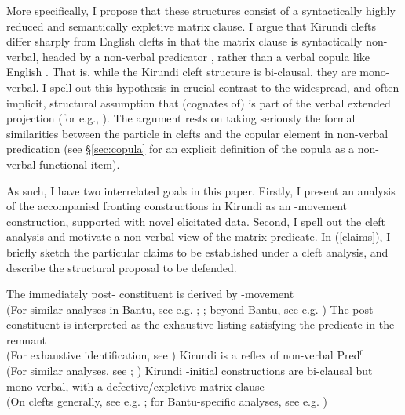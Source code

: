 \documentclass[12pt]{article}
\begin{document}
More specifically, I propose that these structures consist of a syntactically highly reduced and semantically expletive matrix clause. I argue that Kirundi clefts differ sharply from English clefts in that the matrix clause is syntactically non-verbal, headed by a non-verbal predicator , rather than a verbal copula like English . That is, while the Kirundi cleft structure is bi-clausal, they are mono-verbal. I spell out this hypothesis in crucial contrast to the widespread, and often implicit, structural assumption that (cognates of)  is part of the verbal extended projection (for e.g., \citealt{zentz-2016}). The argument rests on taking seriously the formal similarities between the particle in clefts and the copular element in non-verbal predication (see \S\ref{sec:copula} for an explicit definition of the copula as a non-verbal functional item).

As such, I have two interrelated goals in this paper. Firstly, I present an analysis of the  accompanied fronting constructions in Kirundi as an \abar{}-movement construction, supported with novel elicitated data. Second, I spell out the cleft analysis and motivate a non-verbal view of the matrix predicate. In (\ref{claims}), I briefly sketch the particular claims to be established under a cleft analysis, and describe the structural proposal to be defended. 

\bex
\ex\label{claims} 
\bxl
	\ex\label{claims-abar} The immediately post- constituent is derived by \abar{}-movement\\
		{\footnotesize (For similar analyses in Bantu, see e.g. \citealt{schneider-zioga-2007,abels-muriungi-2008}; \citealt[p. 182ff]{zentz-2016}; beyond Bantu, see e.g. \citealt{torrence-2013vol,torrence-2013,klecha-martinovic-2015,martinovic-2021} ) }
	\ex\label{claims-exh} The post- constituent is interpreted as the exhaustive listing satisfying the predicate in the remnant\\
		{\footnotesize (For exhaustive identification, see \citealt{horvath-2005,horvath-2007,horvath-2013,green-2007,hartmann-zimmermann-2012,klecha-martinovic-2015,fominyam-simik-2017})} %
	\ex\label{claims-pred} Kirundi  is a reflex of non-verbal Pred$^{0}$\\
		{\footnotesize (For similar analyses, see \citealt{wasike-2007}; \citealt[193ff]{diercks-2010})}
	\ex\label{claims-nonverb} Kirundi -initial constructions are bi-clausal but mono-verbal, with a defective/expletive  matrix clause\\
		{\footnotesize (On clefts generally, see e.g. \citealt{ekiss-1998,rochemont-1986,chomsky-1971,jackendoff-1972,akmajian-1970,hedberg-2000}; for Bantu-specific analyses, see e.g. \citealt{wasike-2007,diercks-2010,zentz-2016ho,zentz-2016} )}
\fxl
\fex
\end{document}
